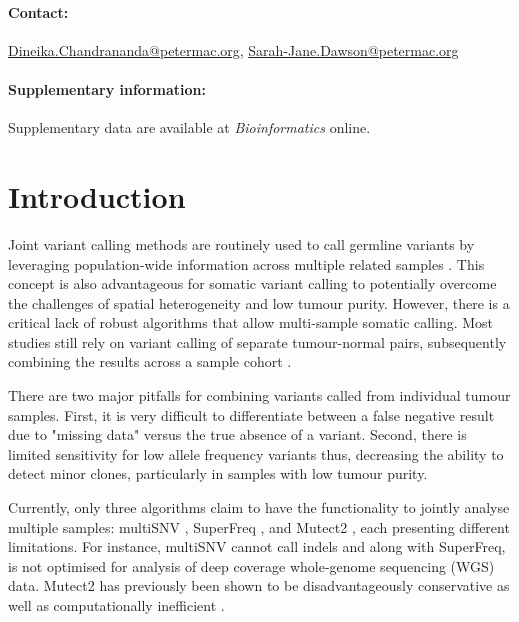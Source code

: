 \paragraph{\textbf{Contact:}} \href{Dineika.Chandrananda@petermac.org}{Dineika.Chandrananda@petermac.org}, \href{Sarah-Jane.Dawson@petermac.org}{Sarah-Jane.Dawson@petermac.org}
\vspace{-2em}
\paragraph{\textbf{Supplementary information:}} Supplementary data are available at \textit{Bioinformatics}
online.



\section{Introduction}
Joint variant calling methods are routinely used to call germline variants by leveraging population-wide information across multiple related samples \parencite{DePristo2011,Toptas2018}. This concept is also advantageous for somatic variant calling to potentially overcome the challenges of spatial heterogeneity and low tumour purity. However, there is a critical lack of robust algorithms that allow multi-sample somatic calling. Most studies still rely on variant calling of separate tumour-normal pairs, subsequently combining the results across a sample cohort \parencite{Hu2019, Leong2018, Wang2018}.

There are two major pitfalls for combining variants called from individual tumour samples. First, it is very difficult to differentiate between a false negative result due to "missing data" versus the true absence of a variant. Second, there is limited sensitivity for low allele frequency variants thus, decreasing the ability to detect minor clones, particularly in samples with low tumour purity.

Currently, only three algorithms claim to have the functionality to jointly analyse multiple samples: multiSNV \parencite{Josephidou2015}, SuperFreq \parencite{Flensburg2020}, and Mutect2 \parencite{Benjamin2019}, each presenting different limitations. For instance, multiSNV cannot call indels and along with SuperFreq, is not optimised for analysis of deep coverage whole-genome sequencing (WGS) data. Mutect2 has previously been shown to be disadvantageously conservative as well as computationally inefficient \parencite{Chen2020a}.

